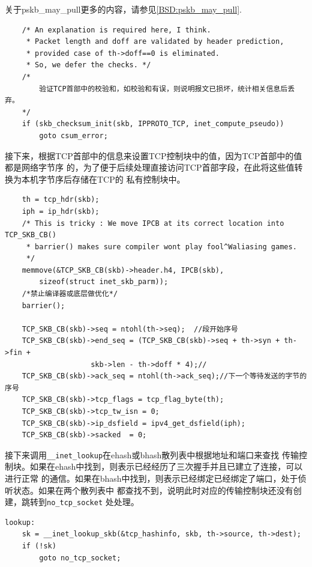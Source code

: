     关于pskb\_may\_pull更多的内容，请参见\ref{BSD:pskb_may_pull}.

\begin{verbatim}
    /* An explanation is required here, I think.
     * Packet length and doff are validated by header prediction,
     * provided case of th->doff==0 is eliminated.
     * So, we defer the checks. */
    /*
        验证TCP首部中的校验和，如校验和有误，则说明报文已损坏，统计相关信息后丢弃。
    */
    if (skb_checksum_init(skb, IPPROTO_TCP, inet_compute_pseudo))
        goto csum_error;
\end{verbatim}

    接下来，根据TCP首部中的信息来设置TCP控制块中的值，因为TCP首部中的值都是网络字节序
    的，为了便于后续处理直接访问TCP首部字段，在此将这些值转换为本机字节序后存储在TCP的
    私有控制块中。
\begin{verbatim}
    th = tcp_hdr(skb);
    iph = ip_hdr(skb);
    /* This is tricky : We move IPCB at its correct location into TCP_SKB_CB()
     * barrier() makes sure compiler wont play fool^Waliasing games.
     */
    memmove(&TCP_SKB_CB(skb)->header.h4, IPCB(skb),
        sizeof(struct inet_skb_parm));
    /*禁止编译器或底层做优化*/
    barrier();

    TCP_SKB_CB(skb)->seq = ntohl(th->seq);  //段开始序号
    TCP_SKB_CB(skb)->end_seq = (TCP_SKB_CB(skb)->seq + th->syn + th->fin +
                    skb->len - th->doff * 4);//
    TCP_SKB_CB(skb)->ack_seq = ntohl(th->ack_seq);//下一个等待发送的字节的序号
    TCP_SKB_CB(skb)->tcp_flags = tcp_flag_byte(th);
    TCP_SKB_CB(skb)->tcp_tw_isn = 0;
    TCP_SKB_CB(skb)->ip_dsfield = ipv4_get_dsfield(iph);
    TCP_SKB_CB(skb)->sacked  = 0;
\end{verbatim}
    
    接下来调用\texttt{__inet_lookup}在ehash或bhash散列表中根据地址和端口来查找
    传输控制块。如果在ehash中找到，则表示已经经历了三次握手并且已建立了连接，可以进行正常
    的通信。如果在bhash中找到，则表示已经绑定已经绑定了端口，处于侦听状态。如果在两个散列表中
    都查找不到，说明此时对应的传输控制块还没有创建，跳转到\texttt{no_tcp_socket}
    处处理。
\begin{verbatim}
lookup:
    sk = __inet_lookup_skb(&tcp_hashinfo, skb, th->source, th->dest);
    if (!sk)
        goto no_tcp_socket;
\end{verbatim}
    
